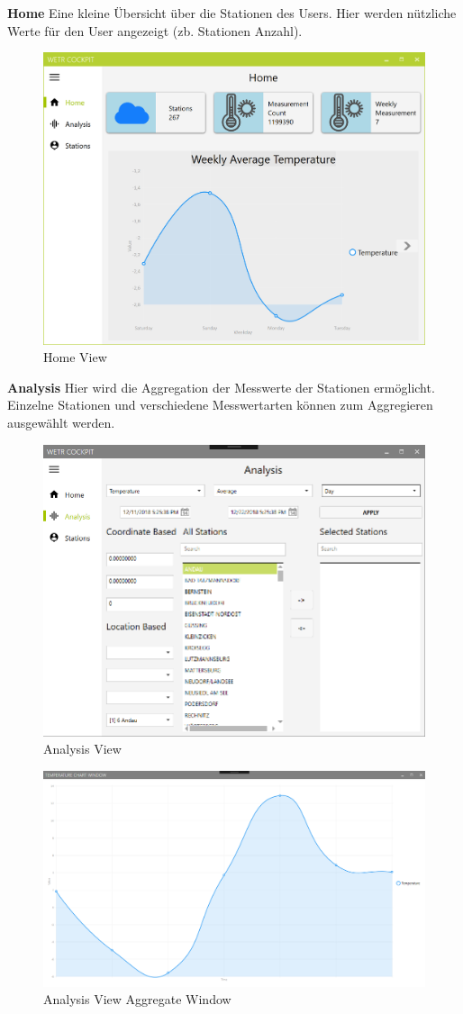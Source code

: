\newpage
\textbf{Home}\newline
Eine kleine Übersicht über die Stationen des Users. Hier werden nützliche Werte für den User angezeigt (zb. Stationen Anzahl).

\begin{figure}[H]
\centering
\includegraphics[width=.7\textwidth]{pictures/Cockpit/Cockpit_2.png}
\caption{Home View}
\label{fig:Wetr.Cockpit.Wpf.HomeView}
\end{figure}
\raggedright

\textbf{Analysis}\newline
Hier wird die Aggregation der Messwerte der Stationen ermöglicht. Einzelne Stationen und verschiedene Messwertarten können zum Aggregieren ausgewählt werden.

\begin{figure}[H]
\centering
\includegraphics[width=.7\textwidth]{pictures/Cockpit/Cockpit_3.png}
\caption{Analysis View}
\label{fig:Wetr.Cockpit.Wpf.Analysis}
\end{figure}
\raggedright

\begin{figure}[H]
\centering
\includegraphics[width=.7\textwidth]{pictures/Cockpit/Cockpit_3_1.png}
\caption{Analysis View Aggregate Window}
\label{fig:Wetr.Cockpit.Wpf.Analysis2}
\end{figure}
\raggedright

